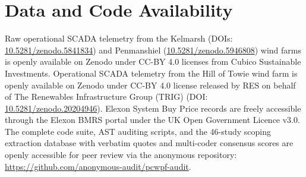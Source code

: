 \documentclass[3p,twocolumn,times]{elsarticle}
\theoremstyle{definition}
\theoremstyle{remark}
\begin{document}
\section*{Data and Code Availability}
Raw operational SCADA telemetry from the Kelmarsh (DOIs: \href{https://doi.org/10.5281/zenodo.5841834}{10.5281/zenodo.5841834}) and Penmanshiel (\href{https://doi.org/10.5281/zenodo.5946808}{10.5281/zenodo.5946808}) wind farms is openly available on Zenodo under CC-BY 4.0 licenses from Cubico Sustainable Investments. Operational SCADA telemetry from the Hill of Towie wind farm is openly available on Zenodo under CC-BY 4.0 license released by RES on behalf of The Renewables Infrastructure Group (TRIG) (DOI: \href{https://doi.org/10.5281/zenodo.20204946}{10.5281/zenodo.20204946}). Elexon System Buy Price records are freely accessible through the Elexon BMRS portal under the UK Open Government Licence v3.0. The complete code suite, AST auditing scripts, and the 46-study scoping extraction database with verbatim quotes and multi-coder consensus scores are openly accessible for peer review via the anonymous repository: \url{https://github.com/anonymous-audit/pcwpf-audit}.

\setlength{\bibsep}{2.5pt plus 0.5pt minus 0.5pt}
\small

\end{document}
